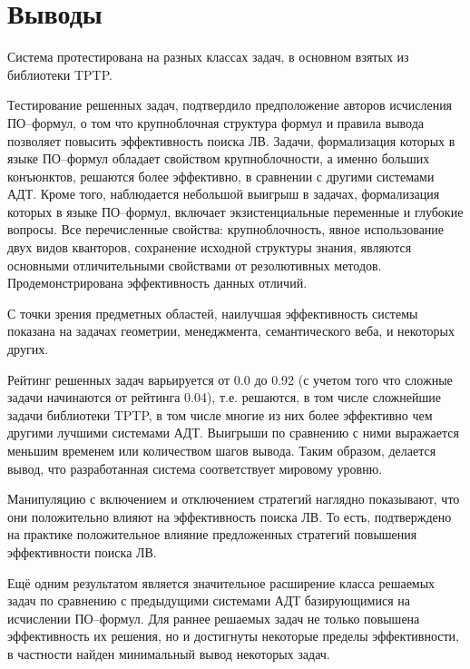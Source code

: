 \section{Выводы}
Система протестирована на разных классах задач, в основном взятых из библиотеки TPTP.  

Тестирование решенных задач, подтвердило предположение авторов исчисления ПО--формул, о том что крупноблочная структура формул и правила вывода позволяет повысить эффективность поиска ЛВ. Задачи, формализация которых в языке ПО--формул обладает свойством крупноблочности, а именно больших конъюнктов, решаются более эффективно, в сравнении с другими системами АДТ. Кроме того, наблюдается небольшой выигрыш в задачах, формализация которых в языке ПО--формул, включает экзистенциальные переменные и глубокие вопросы. Все перечисленные свойства: крупноблочность, явное использование двух видов кванторов, сохранение исходной структуры знания, являются основными отличительными свойствами от резолютивных методов. Продемонстрирована эффективность данных отличий.

С точки зрения предметных областей, наилучшая эффективность системы показана на задачах геометрии, менеджмента, семантического веба, и некоторых других.

Рейтинг решенных задач варьируется от 0.0 до 0.92 (с учетом того что сложные задачи начинаются от рейтинга 0.04), т.е. решаются, в том числе сложнейшие задачи библиотеки TPTP, в том числе многие из них более эффективно чем другими лучшими системами АДТ. Выигрыши по сравнению с ними выражается меньшим временем или количеством шагов вывода. Таким образом, делается вывод, что разработанная система соответствует мировому уровню.

Манипуляцию с включением и отключением стратегий наглядно показывают, что они положительно влияют на эффективность поиска ЛВ. То есть, подтверждено на практике положительное влияние предложенных стратегий повышения эффективности поиска ЛВ.

Ещё одним результатом является значительное расширение класса решаемых задач по сравнению с предыдущими системами АДТ базирующимися на исчислении ПО--формул. Для раннее решаемых задач не только повышена эффективность их решения, но и достигнуты некоторые пределы эффективности, в частности найден минимальный вывод некоторых задач.

